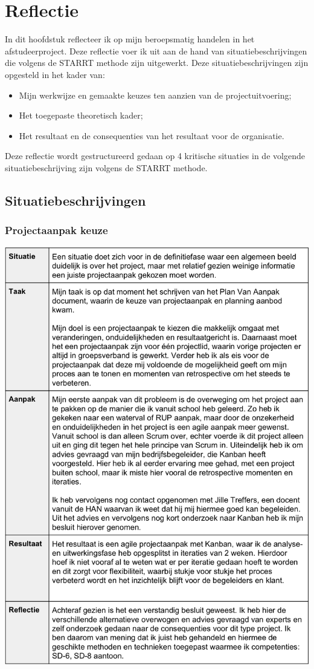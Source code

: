 \chapter{Reflectie}
In dit hoofdstuk reflecteer ik op mijn beroepsmatig handelen in het afstudeerproject. Deze reflectie voer ik uit aan de hand van situatiebeschrijvingen die volgens de STARRT methode zijn uitgewerkt. Deze situatiebeschrijvingen zijn opgesteld in het kader van:
\begin{itemize} 
	\item Mijn werkwijze en gemaakte keuzes ten aanzien van de projectuitvoering;
	\item Het toegepaste theoretisch kader;
	\item Het resultaat en de consequenties van het resultaat voor de organisatie.
\end{itemize}
Deze reflectie wordt gestructureerd gedaan op 4 kritische situaties in de volgende situatiebeschrijving zijn volgens de STARRT methode.

\section{Situatiebeschrijvingen}

\subsection{Projectaanpak keuze}
\includegraphics[width=\paperwidth-200]{images/sit_projectaanpak}

